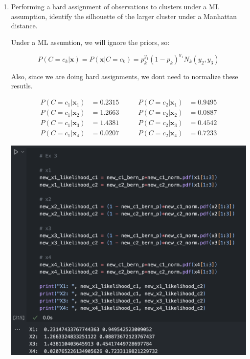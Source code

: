 \documentclass[12pt]{article}
\begin{document}
\begin{enumerate}[leftmargin=\labelsep]
    \item Performing a hard assignment of observations to clusters under a ML assumption, identify
    the silhouette of the larger cluster under a Manhattan distance.

    Under a ML assumtion, we will ignore the priors, so:

    \begin{equation}
        P(C = c_k|\mathbf{x}) = P(\mathbf{x}|C = c_k) = p_k^{y_1}(1-p_k)^{y_1}N_k(y_2, y_3)
    \end{equation}

    Also, since we are doing hard assignments, we dont need to normalize these resutls.

    \begin{equation}
    \begin{aligned}
        P(C = c_1 | \mathbf{x}_1) &= 0.2315 &\qquad P(C = c_2 | \mathbf{x}_1) &= 0.9495 \\
        P(C = c_1 | \mathbf{x}_2) &= 1.2663 &\qquad P(C = c_2 | \mathbf{x}_2) &= 0.0887 \\
        P(C = c_1 | \mathbf{x}_3) &= 1.4381 &\qquad P(C = c_2 | \mathbf{x}_3) &= 0.4542 \\
        P(C = c_1 | \mathbf{x}_4) &= 0.0207 &\qquad P(C = c_2 | \mathbf{x}_4) &= 0.7233
    \end{aligned}
    \end{equation}

    \begin{center}
        \includegraphics[scale=0.5]{images/code5.png}
    \end{center}


\end{enumerate}
\end{document}
